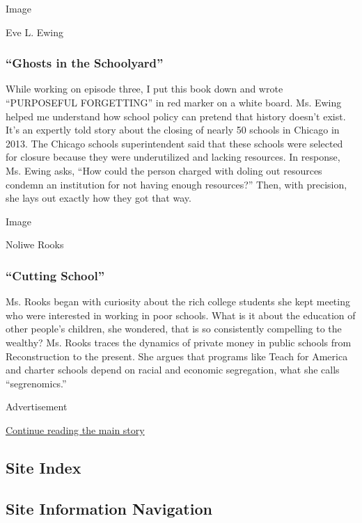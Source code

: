 Image

Eve L. Ewing

\hypertarget{ghosts-in-the-schoolyard}{%
\subsubsection{``Ghosts in the
Schoolyard''}\label{ghosts-in-the-schoolyard}}

While working on episode three, I put this book down and wrote
``PURPOSEFUL FORGETTING'' in red marker on a white board. Ms. Ewing
helped me understand how school policy can pretend that history doesn't
exist. It's an expertly told story about the closing of nearly 50
schools in Chicago in 2013. The Chicago schools superintendent said that
these schools were selected for closure because they were underutilized
and lacking resources. In response, Ms. Ewing asks, ``How could the
person charged with doling out resources condemn an institution for not
having enough resources?'' Then, with precision, she lays out exactly
how they got that way.

Image

Noliwe Rooks

\hypertarget{cutting-school}{%
\subsubsection{``Cutting School''}\label{cutting-school}}

Ms. Rooks began with curiosity about the rich college students she kept
meeting who were interested in working in poor schools. What is it about
the education of other people's children, she wondered, that is so
consistently compelling to the wealthy? Ms. Rooks traces the dynamics of
private money in public schools from Reconstruction to the present. She
argues that programs like Teach for America and charter schools depend
on racial and economic segregation, what she calls ``segrenomics.''

Advertisement

\protect\hyperlink{after-bottom}{Continue reading the main story}

\hypertarget{site-index}{%
\subsection{Site Index}\label{site-index}}

\hypertarget{site-information-navigation}{%
\subsection{Site Information
Navigation}\label{site-information-navigation}}

